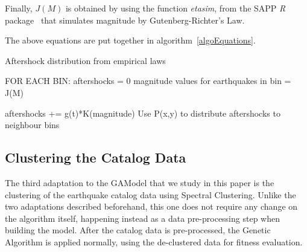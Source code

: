
Finally, $J(M)$ is obtained by using the function \emph{etasim}, from
the SAPP \textit{R} package~\cite{webSapp} that simulates magnitude by
Gutenberg-Richter’s Law.

The above equations are put together in algorithm~\ref{algoEquations}.

\begin{algorithm}[H]\label{algoEquations}
  \caption{Aftershock distribution from empirical laws}
  \begin{algorithmic}
    \STATE FOR EACH BIN:
    \ENDIF
    \STATE aftershocks = 0
    \STATE magnitude values for earthquakes in bin = J(M)
    
    \STATE aftershocks += g(t)*K(magnitude)
    \ENDFOR
    \ENDFOR
    \STATE Use P(x,y) to distribute aftershocks to neighbour bins
  \end{algorithmic}
\end{algorithm}


\subsection{Clustering the Catalog Data}

The third adaptation to the GAModel that we study in this paper is the
clustering of the earthquake catalog data using Spectral
Clustering. Unlike the two adaptations described beforehand, this one
does not require any change on the algorithm itself, happening instead
as a data pre-processing step when building the model. After the
catalog data is pre-processed, the Genetic Algorithm is applied
normally, using the de-clustered data for fitness evaluation.

